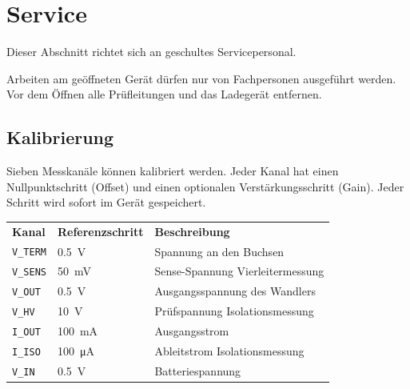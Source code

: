 \section{Service}
\label{sec:service}

Dieser Abschnitt richtet sich an geschultes Servicepersonal.

\begin{warning}
    Arbeiten am geöffneten Gerät dürfen nur von Fachpersonen ausgeführt werden.
    Vor dem Öffnen alle Prüfleitungen und das Ladegerät entfernen.
\end{warning}

\subsection{Kalibrierung}
\label{sec:calibration}
Sieben Messkanäle können kalibriert werden. Jeder Kanal hat einen Nullpunktschritt (Offset)
und einen optionalen Verstärkungsschritt (Gain). Jeder Schritt wird sofort im Gerät gespeichert.

\begin{tabular}{llp{8cm}}
    \rowcolor{gray} \textbf{Kanal} & \textbf{Referenzschritt} & \textbf{Beschreibung} \\
    \texttt{V\_TERM} & \qty{0.5}{\volt}           & Spannung an den Buchsen \\
    \texttt{V\_SENS} & \qty{50}{\milli\volt}      & Sense-Spannung Vierleitermessung \\
    \texttt{V\_OUT}  & \qty{0.5}{\volt}           & Ausgangsspannung des Wandlers \\
    \texttt{V\_HV}   & \qty{10}{\volt}            & Prüfspannung Isolationsmessung \\
    \texttt{I\_OUT}  & \qty{100}{\milli\ampere}   & Ausgangsstrom \\
    \texttt{I\_ISO}  & \qty{100}{\micro\ampere}   & Ableitstrom Isolationsmessung \\
    \texttt{V\_IN}   & \qty{0.5}{\volt}           & Batteriespannung \\
\end{tabular}

